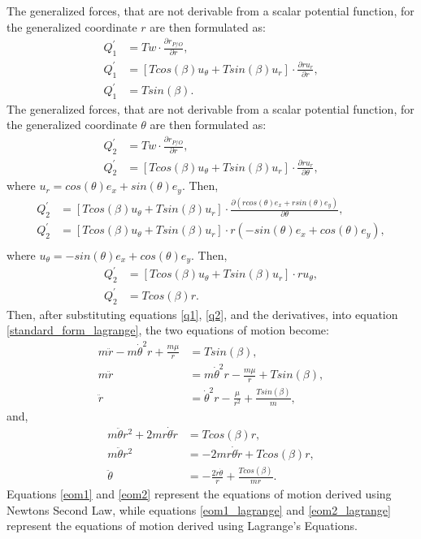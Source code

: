 \documentclass[]{article}
\begin{document}
The generalized forces, that are not derivable from a scalar potential function, for the generalized coordinate \(r\) are then formulated as:
\begin{align}
	Q^{'}_{1} &= Tw \cdot  \frac{\partial r_{P/O}}{\partial r}, \nonumber\\
	Q^{'}_{1} &= [Tcos(\beta)u_{\theta} + Tsin(\beta)u_{r}] \cdot \frac{\partial ru_{r}}{\partial r}, \nonumber\\
	Q^{'}_{1} &= Tsin(\beta) \label{q1}.
\end{align}
The generalized forces, that are not derivable from a scalar potential function, for the generalized coordinate \(\theta\) are then formulated as:
\begin{align*}
	Q^{'}_{2} &= Tw \cdot  \frac{\partial r_{P/O}}{\partial r}, \\
	Q^{'}_{2} &= [Tcos(\beta)u_{\theta} + Tsin(\beta)u_{r}] \cdot \frac{\partial ru_{r}}{\partial \theta},
\end{align*}
where \(u_r = cos(\theta)e_{x} + sin(\theta)e_{y}\). Then,
\begin{align*}
	Q^{'}_{2} &= [Tcos(\beta)u_{\theta} + Tsin(\beta)u_{r}] \cdot \frac{\partial (rcos(\theta)e_{x} + rsin(\theta)e_{y})}{\partial \theta}, \\
	Q^{'}_{2} &= [Tcos(\beta)u_{\theta} + Tsin(\beta)u_{r}] \cdot r(-sin(\theta)e_{x} + cos(\theta)e_{y}), \\
\end{align*}
where \(u_{\theta} = -sin(\theta)e_{x} + cos(\theta)e_{y}\). Then,
\begin{align}
	Q^{'}_{2} &= [Tcos(\beta)u_{\theta} + Tsin(\beta)u_{r}] \cdot ru_{\theta}, \nonumber\\
	Q^{'}_{2} &= Tcos(\beta)r. \label{q2}
\end{align}
Then, after substituting equations \ref{q1}, \ref{q2}, and the derivatives, into equation \ref{standard_form_lagrange}, the two equations of motion become:
\begin{align}
 m\ddot{r} - m\dot{\theta}^2r + \frac{m\mu}{r} &= Tsin(\beta), \nonumber\\
 m\ddot{r}                                     &= m\dot{\theta}^2r - \frac{m\mu}{r} + Tsin(\beta), \nonumber\\
 \ddot{r}                                      &= \dot{\theta}^2r - \frac{\mu}{r^2} + \frac{Tsin(\beta)}{m} \label{eom1_lagrange},
\end{align}
and,
\begin{align}
 m\ddot{\theta}r^2 + 2mr\dot{\theta}\dot{r}    &= Tcos(\beta)r, \nonumber\\
 m\ddot{\theta}r^2                             &= -2mr\dot{\theta}\dot{r} + Tcos(\beta)r, \nonumber\\
 \ddot{\theta}                                &= -\frac{2\dot{r}\dot{\theta}}{r}   + \frac{Tcos(\beta)}{mr} \label{eom2_lagrange}.
\end{align}
\vspace{2mm}\newline
Equations \ref{eom1} and \ref{eom2} represent the equations of motion derived using Newtons Second Law, while equations \ref{eom1_lagrange} and \ref{eom2_lagrange} represent the equations of motion derived using Lagrange's Equations. 
\end{document}
